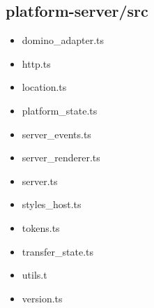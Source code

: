 \subsection{platform-server/src}


\begin{itemize}
  \item domino\_adapter.ts
  \item http.ts
  \item location.ts
  \item platform\_state.ts
  \item server\_events.ts
  \item server\_renderer.ts
  \item server.ts
  \item styles\_host.ts
  \item tokens.ts
  \item transfer\_state.ts
  \item utils.t
  \item version.ts
\end{itemize}













